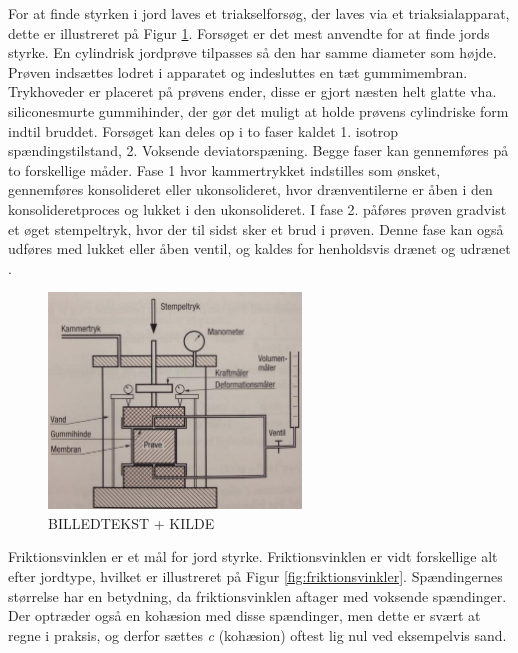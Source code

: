 For at finde styrken i jord laves et triakselforsøg, der laves via et triaksialapparat, dette er illustreret på Figur \ref{fig:forskudningsspanding}. Forsøget er det mest anvendte for at finde jords styrke. En cylindrisk jordprøve tilpasses så den har samme diameter som højde. Prøven indsættes lodret i apparatet og indesluttes en tæt gummimembran. Trykhoveder er placeret på prøvens ender, disse er gjort næsten helt glatte vha. siliconesmurte gummihinder, der gør det muligt at holde prøvens cylindriske form indtil bruddet.  
\newline \indent{     } Forsøget kan deles op i to faser kaldet 1. isotrop spændingstilstand, 2. Voksende deviatorspæning. Begge faser kan gennemføres på to forskellige måder. Fase 1 hvor kammertrykket indstilles som ønsket, gennemføres konsolideret eller ukonsolideret, hvor drænventilerne er åben i den konsolideretproces og lukket i den ukonsolideret. I fase 2. påføres prøven gradvist et øget stempeltryk, hvor der til sidst sker et brud i prøven. Denne fase kan også udføres med lukket eller åben ventil, og kaldes for henholdsvis drænet og udrænet \citep{geoteknik}.

\begin{figure}[htbp]
	\centering
	\includegraphics[width=0.6\textwidth]{billeder/forskud.png}
	\caption{BILLEDTEKST + KILDE}
	\label{fig:forskudningsspanding}
\end{figure}

\indent{     } 																																																																																																																																																																																						 Friktionsvinklen er et mål for jord styrke. Friktionsvinklen er vidt forskellige alt efter jordtype, hvilket er illustreret på Figur \ref{fig:friktionsvinkler}. Spændingernes størrelse har en betydning, da friktionsvinklen aftager med voksende spændinger. Der optræder også en kohæsion med disse spændinger, men dette er svært at regne i praksis, og derfor sættes \textit{c} (kohæsion) oftest lig nul ved eksempelvis sand. 

